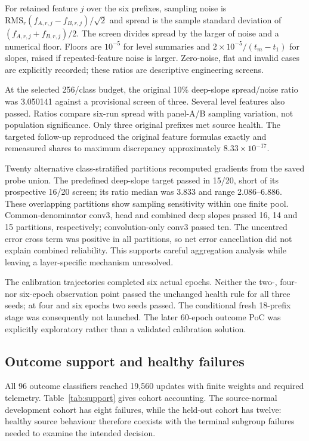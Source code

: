 \documentclass[nolineno]{ieeeaccess}
\begin{document}
For retained feature $j$ over the six prefixes, sampling noise is $\mathrm{RMS}_r(f_{A,r,j}-f_{B,r,j})/\sqrt{2}$ and spread is the sample standard deviation of $(f_{A,r,j}+f_{B,r,j})/2$. The screen divides spread by the larger of noise and a numerical floor. Floors are $10^{-5}$ for level summaries and $2\times10^{-5}/(t_m-t_1)$ for slopes, raised if repeated-feature noise is larger. Zero-noise, flat and invalid cases are explicitly recorded; these ratios are descriptive engineering screens.

At the selected 256/class budget, the original 10\% deep-slope spread/noise ratio was 3.050141 against a provisional screen of three. Several level features also passed. Ratios compare six-run spread with panel-A/B sampling variation, not population significance. Only three original prefixes met source health. The targeted follow-up reproduced the original feature formulas exactly and remeasured shares to maximum discrepancy approximately $8.33\times10^{-17}$.

Twenty alternative class-stratified partitions recomputed gradients from the saved probe union. The predefined deep-slope target passed in 15/20, short of its prospective 16/20 screen; its ratio median was 3.833 and range 2.086--6.886. These overlapping partitions show sampling sensitivity within one finite pool. Common-denominator conv3, head and combined deep slopes passed 16, 14 and 15 partitions, respectively; convolution-only conv3 passed ten. The uncentred error cross term was positive in all partitions, so net error cancellation did not explain combined reliability. This supports careful aggregation analysis while leaving a layer-specific mechanism unresolved.

The calibration trajectories completed six actual epochs. Neither the two-, four- nor six-epoch observation point passed the unchanged health rule for all three seeds; at four and six epochs two seeds passed. The conditional fresh 18-prefix stage was consequently not launched. The later 60-epoch outcome PoC was explicitly exploratory rather than a validated calibration solution.

\subsection{Outcome support and healthy failures}
All 96 outcome classifiers reached 19,560 updates with finite weights and required telemetry. Table~\ref{tab:support} gives cohort accounting. The source-normal development cohort has eight failures, while the held-out cohort has twelve: healthy source behaviour therefore coexists with the terminal subgroup failures needed to examine the intended decision.
\end{document}
